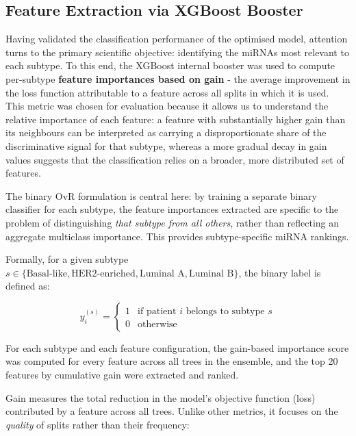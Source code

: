 \subsection{Feature Extraction via XGBoost Booster}
\label{sec:booster-features}

Having validated the classification performance of the optimised model, attention turns to the
primary scientific objective: identifying the miRNAs most relevant to each subtype. To this end,
the XGBoost internal booster was used to compute per-subtype \textbf{feature importances based
on gain} - the average improvement in the loss function attributable to a feature across all
splits in which it is used. This metric was chosen for evaluation because it allows us 
to understand the relative importance of each feature: 
a feature with substantially higher gain than its neighbours can be interpreted 
as carrying a disproportionate share of the discriminative signal for that 
subtype, whereas a more gradual decay in gain values suggests that the 
classification relies on a broader, more distributed set of features. 

The binary OvR formulation is central here: by training a separate binary classifier for each
subtype, the feature importances extracted are specific to the problem of distinguishing
\textit{that subtype from all others}, rather than reflecting an aggregate multiclass importance.
This provides subtype-specific miRNA rankings.

Formally, for a given subtype $s \in \{\text{Basal-like}, \text{HER2-enriched},
\text{Luminal~A}, \text{Luminal~B}\}$, the binary label is defined as:

\begin{equation}
y_i^{(s)} = \begin{cases} 1 & \text{if patient } i \text{ belongs to subtype } s \\ 0 & \text{otherwise} \end{cases}
\end{equation}

For each subtype and each feature configuration, the gain-based importance score 
was computed for every feature across all trees in the ensemble, and the top 20 
features by cumulative gain were extracted and ranked.

\noindent Gain measures the total reduction in the model's objective function 
(loss) contributed by a feature across all trees. Unlike other metrics, it focuses on the 
\textit{quality} of splits rather than their frequency:

